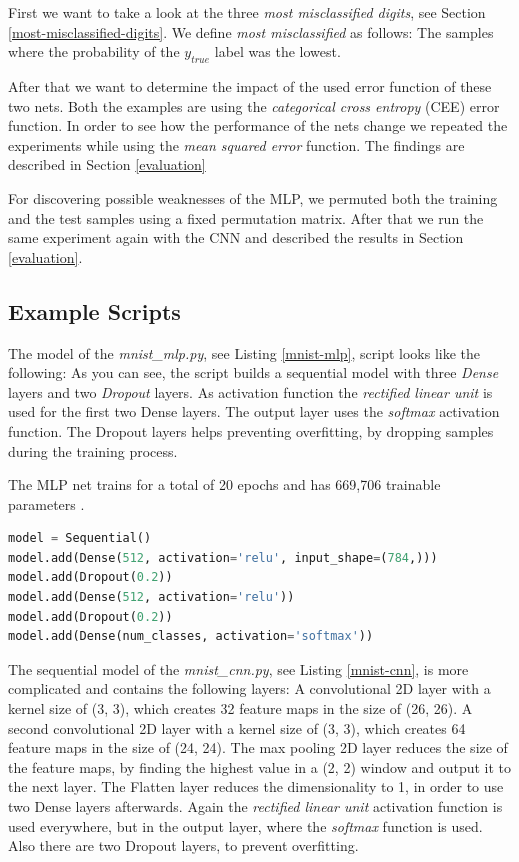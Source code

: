 \documentclass{article}[]
\begin{document}
First we want to take a look at the three \emph{most misclassified digits}, see Section \ref{most-misclassified-digits}.
We define \textit{most misclassified} as follows: The samples where the probability of the $y_{true}$ label was the lowest.

After that we want to determine the impact of the used error function of these two nets.
Both the examples are using the \emph{categorical cross entropy} (CEE) error function.
In order to see how the performance of the nets change we repeated the experiments while using the \emph{mean squared error} function.
The findings are described in Section \ref{evaluation}

For discovering possible weaknesses of the MLP, we permuted both the training and the test samples using a fixed permutation matrix.
After that we run the same experiment again with the CNN and described the results in Section \ref{evaluation}.


\subsection{Example Scripts}
\label{example-scripts}

The model of the \emph{mnist\_mlp.py}, see Listing \ref{mnist-mlp}, script looks like the following:
As you can see, the script builds a sequential model with three \emph{Dense} layers and two \emph{Dropout} layers.
As activation function the \emph{rectified linear unit} is used for the first two Dense layers.
The output layer uses the \emph{softmax} activation function.
The Dropout layers helps preventing overfitting, by dropping samples during the training process.

The MLP net trains for a total of 20 epochs and has 669,706 trainable parameters .

\begin{lstlisting}[language=Python, label=mnist-mlp, caption={mnist\_cnn.py model}, captionpos=b]
model = Sequential()
model.add(Dense(512, activation='relu', input_shape=(784,)))
model.add(Dropout(0.2))
model.add(Dense(512, activation='relu'))
model.add(Dropout(0.2))
model.add(Dense(num_classes, activation='softmax'))
\end{lstlisting}

The sequential model of the \emph{mnist\_cnn.py}, see Listing \ref{mnist-cnn}, is more complicated and contains the following layers:
A convolutional 2D layer with a kernel size of (3, 3), which creates 32 feature maps in the size of (26, 26).
A second convolutional 2D layer with a kernel size of (3, 3), which creates 64 feature maps in the size of (24, 24).
The max pooling 2D layer reduces the size of the feature maps, by finding the highest value in a (2, 2) window and output it to the next layer.
The Flatten layer reduces the dimensionality to 1, in order to use two Dense layers afterwards.
Again the \emph{rectified linear unit} activation function is used everywhere, but in the output layer, where the \emph{softmax} function is used.
Also there are two Dropout layers, to prevent overfitting.
\end{document}
